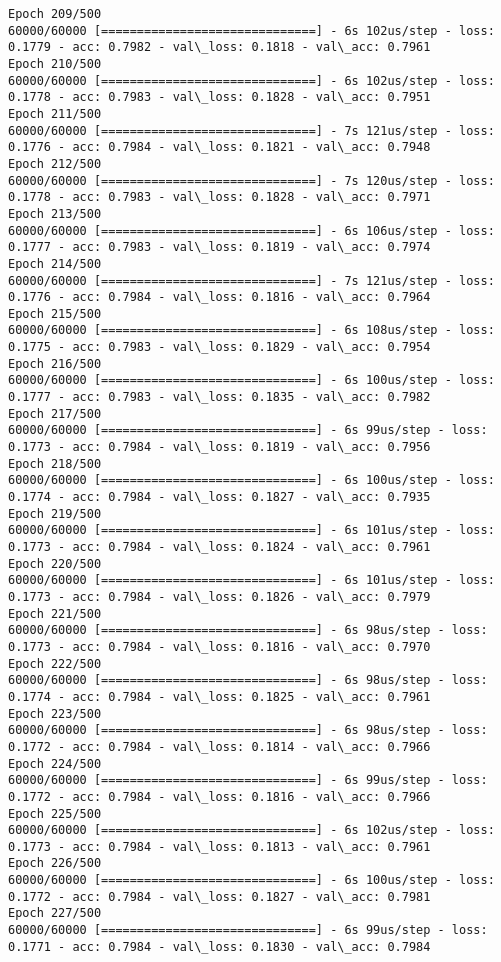 \documentclass[11pt]{article}
\begin{document}
\begin{Verbatim}[commandchars=\\\{\}]
Epoch 209/500
60000/60000 [==============================] - 6s 102us/step - loss: 0.1779 - acc: 0.7982 - val\_loss: 0.1818 - val\_acc: 0.7961
Epoch 210/500
60000/60000 [==============================] - 6s 102us/step - loss: 0.1778 - acc: 0.7983 - val\_loss: 0.1828 - val\_acc: 0.7951
Epoch 211/500
60000/60000 [==============================] - 7s 121us/step - loss: 0.1776 - acc: 0.7984 - val\_loss: 0.1821 - val\_acc: 0.7948
Epoch 212/500
60000/60000 [==============================] - 7s 120us/step - loss: 0.1778 - acc: 0.7983 - val\_loss: 0.1828 - val\_acc: 0.7971
Epoch 213/500
60000/60000 [==============================] - 6s 106us/step - loss: 0.1777 - acc: 0.7983 - val\_loss: 0.1819 - val\_acc: 0.7974
Epoch 214/500
60000/60000 [==============================] - 7s 121us/step - loss: 0.1776 - acc: 0.7984 - val\_loss: 0.1816 - val\_acc: 0.7964
Epoch 215/500
60000/60000 [==============================] - 6s 108us/step - loss: 0.1775 - acc: 0.7983 - val\_loss: 0.1829 - val\_acc: 0.7954
Epoch 216/500
60000/60000 [==============================] - 6s 100us/step - loss: 0.1777 - acc: 0.7983 - val\_loss: 0.1835 - val\_acc: 0.7982
Epoch 217/500
60000/60000 [==============================] - 6s 99us/step - loss: 0.1773 - acc: 0.7984 - val\_loss: 0.1819 - val\_acc: 0.7956
Epoch 218/500
60000/60000 [==============================] - 6s 100us/step - loss: 0.1774 - acc: 0.7984 - val\_loss: 0.1827 - val\_acc: 0.7935
Epoch 219/500
60000/60000 [==============================] - 6s 101us/step - loss: 0.1773 - acc: 0.7984 - val\_loss: 0.1824 - val\_acc: 0.7961
Epoch 220/500
60000/60000 [==============================] - 6s 101us/step - loss: 0.1773 - acc: 0.7984 - val\_loss: 0.1826 - val\_acc: 0.7979
Epoch 221/500
60000/60000 [==============================] - 6s 98us/step - loss: 0.1773 - acc: 0.7984 - val\_loss: 0.1816 - val\_acc: 0.7970
Epoch 222/500
60000/60000 [==============================] - 6s 98us/step - loss: 0.1774 - acc: 0.7984 - val\_loss: 0.1825 - val\_acc: 0.7961
Epoch 223/500
60000/60000 [==============================] - 6s 98us/step - loss: 0.1772 - acc: 0.7984 - val\_loss: 0.1814 - val\_acc: 0.7966
Epoch 224/500
60000/60000 [==============================] - 6s 99us/step - loss: 0.1772 - acc: 0.7984 - val\_loss: 0.1816 - val\_acc: 0.7966
Epoch 225/500
60000/60000 [==============================] - 6s 102us/step - loss: 0.1773 - acc: 0.7984 - val\_loss: 0.1813 - val\_acc: 0.7961
Epoch 226/500
60000/60000 [==============================] - 6s 100us/step - loss: 0.1772 - acc: 0.7984 - val\_loss: 0.1827 - val\_acc: 0.7981
Epoch 227/500
60000/60000 [==============================] - 6s 99us/step - loss: 0.1771 - acc: 0.7984 - val\_loss: 0.1830 - val\_acc: 0.7984

\end{Verbatim}
\end{document}
